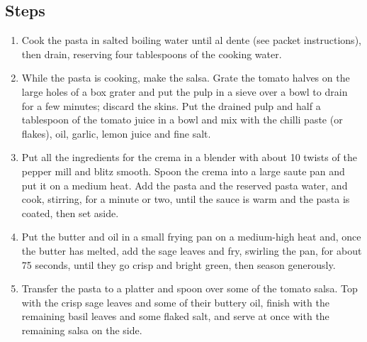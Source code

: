 \documentclass{book}
\begin{document}
\subsection*{Steps}
\begin{enumerate}
\item Cook the pasta in salted boiling water until al dente (see packet instructions), then drain, reserving four tablespoons of the cooking water.
\item While the pasta is cooking, make the salsa. Grate the tomato halves on the large holes of a box grater and put the pulp in a sieve over a bowl to drain for a few minutes; discard the skins. Put the drained pulp and half a tablespoon of the tomato juice in a bowl and mix with the chilli paste (or flakes), oil, garlic, lemon juice and fine salt. 
\item Put all the ingredients for the crema in a blender with about 10 twists of the pepper mill and blitz smooth. Spoon the crema into a large saute pan and put it on a medium heat. Add the pasta and the reserved pasta water, and cook, stirring, for a minute or two, until the sauce is warm and the pasta is coated, then set aside.
\item Put the butter and oil in a small frying pan on a medium-high heat and, once the butter has melted, add the sage leaves and fry, swirling the pan, for about 75 seconds, until they go crisp and bright green, then season generously.
\item Transfer the pasta to a platter and spoon over some of the tomato salsa. Top with the crisp sage leaves and some of their buttery oil, finish with the remaining basil leaves and some flaked salt, and serve at once with the remaining salsa on the side.
\end{enumerate}
\newpage
\end{document}
